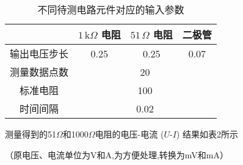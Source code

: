 \documentclass[11pt]{article}
\newcommand{\unit}[1]{\,\text{#1}}
\begin{document}
\begin{enumerate}
    \begin{table}[htbp]
        \centering
        \caption{不同待测电路元件对应的输入参数}
        \begin{tabular}{|c|c|c|c|}
            \hline
                    & $1 \unit{k$\Omega$}$ 电阻  & $51 \unit{$\Omega$}$ 电阻  & 二极管 \bigstrut\\
            \hline
            输出电压步长 & 0.25    & 0.25   & 0.07 \bigstrut\\
            \hline
            测量数据点数 & \multicolumn{3}{c|}{20} \bigstrut\\
            \hline
            标准电阻   & \multicolumn{3}{c|}{100} \bigstrut\\
            \hline
            时间间隔   & \multicolumn{3}{c|}{0.02} \bigstrut\\
            \hline
        \end{tabular}%
    \end{table}%

    \newpage
    测量得到的51$\Omega $和1000$\Omega$电阻的电压-电流 ($U$-$I$) 
    结果如表2所示
    
    （原电压、电流单位为V和A,为方便处理,转换为mV和mA）
    


\end{enumerate}
\end{document}

